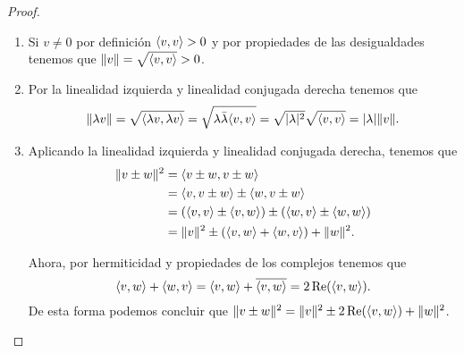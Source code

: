 \begin{proof}~
  \begin{enumerate}
    \item Si $v \neq 0$ por definición $\langle v,v\rangle>0$ y por propiedades de las desigualdades tenemos que $\mathopen\|v\mathclose\| = \sqrt{\langle v,v\rangle}>0$.
    
    \item Por la linealidad izquierda y linealidad conjugada derecha tenemos que 
      \[ \mathopen\|\lambda v\mathclose\| = \sqrt{\langle\lambda v, \lambda v\rangle} = \sqrt{\lambda \bar\lambda \langle v,v\rangle} = \sqrt{\mathopen|\lambda\mathclose|^2} \sqrt{\langle v,v\rangle} = \mathopen|\lambda\mathclose|\mathopen\|v\mathclose\|. \]
    
    \item Aplicando la linealidad izquierda y linealidad conjugada derecha, tenemos que
      \begin{align*}
        \mathopen\|v \pm w\mathclose\|^2 &= \langle v\pm w, v\pm w\rangle \\
          &= \langle v,v\pm w\rangle \pm \langle w, v\pm w\rangle \\
          &= (\langle v,v\rangle \pm \langle v,w\rangle) \pm (\langle w,v\rangle \pm \langle w,w\rangle) \\
          &= \mathopen\|v\mathclose\|^2 \pm(\langle v,w\rangle + \langle w,v\rangle) + \mathopen\|w\mathclose\|^2.
      \end{align*}

      Ahora, por hermiticidad y propiedades de los complejos tenemos que 
        \[
          \langle v,w\rangle + \langle w,v\rangle = \langle v,w\rangle + \overline{\langle v,w\rangle} = 2\operatorname{Re}(\langle v,w\rangle).
        \]
      De esta forma podemos concluir que $\mathopen\|v\pm w\mathclose\|^2 = \mathopen\|v\mathclose\|^2 \pm 2\operatorname{Re}(\langle v,w\rangle) + \mathopen\|w\mathclose\|^2$.


\end{enumerate}
\end{proof}
